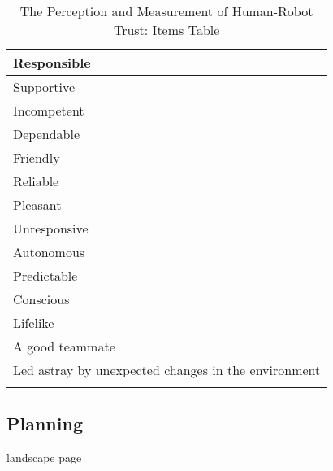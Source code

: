 \begin{longtable}{l}
	Responsible \\ \hline
	Supportive \\ \hline
	Incompetent \\ \hline
	Dependable \\ \hline
	Friendly \\ \hline
	Reliable \\ \hline
	Pleasant \\ \hline
	Unresponsive \\ \hline
	Autonomous \\ \hline
	Predictable \\ \hline
	Conscious \\ \hline
	Lifelike \\ \hline
	A good teammate \\ \hline
	Led astray by unexpected changes in the environment \\
	\caption{The Perception and Measurement of Human-Robot Trust: Items Table}
	\label{tbl:measurement.items.table}	
\end{longtable}

\newpage
\begin{landscape}
	\section{Planning}
	\label{app:Educational}	
	landscape page
\end{landscape}

